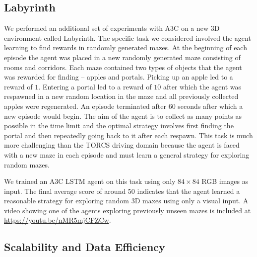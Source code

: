 \documentclass{article} \usepackage{times}
\begin{document}
\subsection{Labyrinth}



We performed an additional set of experiments with A3C on a new 3D environment called Labyrinth.
The specific task we considered involved the agent learning to find rewards in randomly generated mazes.
At the beginning of each episode the agent was placed in a new randomly generated maze consisting of rooms and corridors.
Each maze contained two types of objects that the agent was rewarded for finding -- apples and portals.
Picking up an apple led to a reward of $1$.  Entering a portal led to a reward of $10$ after which the agent was respawned in a new random location in the maze and all previously collected apples were regenerated.
An episode terminated after 60 seconds after which a new episode would begin.
The aim of the agent is to collect as many points as possible in the time limit and the optimal strategy involves first finding the portal and then repeatedly going back to it after each respawn.
This task is much more challenging than the TORCS driving domain because the agent is faced with a new maze in each episode and must learn a general strategy for exploring random mazes.

We trained an A3C LSTM agent on this task using only $84\times 84$ RGB images as input.
The final average score of around 50 indicates that the agent learned a reasonable strategy for exploring random 3D maxes using only a visual input.
A video showing one of the agents exploring previously unseen mazes is included at \url{https://youtu.be/nMR5mjCFZCw}.

\subsection{Scalability and Data Efficiency}
\end{document}
